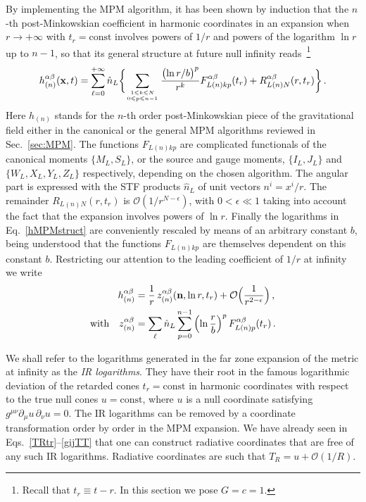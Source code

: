 \documentclass[prd,preprint,superscriptaddress,tightenlines,nofootinbib,
  eqsecnum,showpacs]{revtex4}
\begin{document}
By implementing the MPM algorithm, it has been shown by induction that
the $n$-th post-Minkowskian coefficient in harmonic coordinates in an
expansion when $r\to +\infty$ with $t_r=\text{const}$ involves powers
of $1/r$ and powers of the logarithm $\ln r$ up to $n-1$, so that its
general structure at future null infinity
reads~\cite{BD86}\footnote{Recall that $t_r\equiv t-r$.  In this
  section we pose $G=c=1$.}
%
\begin{equation}\label{hMPMstruct}
h^{\alpha\beta}_{(n)}(\mathbf{x}, t) = \sum_{\ell=0}^{+\infty}
\hat{n}_L \biggl\{\sum_{1 \leqslant k \leqslant N\atop 0\leqslant p
  \leqslant n-1} \frac{\bigl(\ln r/b\bigr)^p}{r^k}
F^{\alpha\beta}_{L(n)kp}(t_r) + R_{L(n)N}^{\alpha\beta}(r,t_r)
\biggr\} \,.
\end{equation}
%
Here $h_{(n)}$ stands for the $n$-th order post-Minkowskian
piece of the gravitational field either in the canonical or the
general MPM algorithms reviewed in Sec.~\ref{sec:MPM}. The functions
$F_{L(n)kp}$ are complicated functionals of the canonical moments
$\{M_L, S_L\}$, or the source and gauge moments, $\{I_L, J_L\}$ and
$\{W_L, X_L, Y_L, Z_L\}$ respectively, depending on the chosen
algorithm. The angular part is expressed with the STF products
$\hat{n}_L$ of unit vectors $n^i=x^i/r$. The remainder
$R_{L(n)N}(r,t_r)$ is $\mathcal{O}(1/r^{N-\epsilon})$, with
$0<\epsilon\ll 1$ taking into account the fact that the expansion
involves powers of $\ln r$. Finally the logarithms in
Eq.~\eqref{hMPMstruct} are conveniently rescaled by means of an
arbitrary constant $b$, being understood that the functions
$F_{L(n)kp}$ are themselves dependent on this constant
$b$. Restricting our attention to the leading coefficient of $1/r$ at
infinity we write
%
\begin{subequations}\label{hnasymp}
\begin{align}
h^{\alpha\beta}_{(n)} &= \frac{1}{r}
\,z^{\alpha\beta}_{(n)}(\mathbf{n}, \ln r, t_r) + \mathcal{O}\Bigl(
\frac{1}{r^{2-\epsilon}}\Bigr) \,,\\\text{with}\quad
z^{\alpha\beta}_{(n)} &= \sum_{\ell} \hat{n}_L \sum_{p=0}^{n-1}
\left(\ln\frac{r}{b}\right)^p F_{L(n)p}^{\alpha\beta}(t_r)\,.
\end{align}
\end{subequations}
%

We shall refer to the logarithms generated in the far zone expansion
of the metric at infinity as the \textit{IR logarithms}. They have
their root in the famous logarithmic deviation of the retarded cones
$t_r=\text{const}$ in harmonic coordinates with respect to the true
null cones $u=\text{const}$, where $u$ is a null coordinate
  satisfying $g^{\mu\nu}\partial_\mu u \,\partial_\nu u=0$. The IR
logarithms can be removed by a coordinate transformation order by
order in the MPM expansion. We have already seen in
Eqs.~\eqref{TRtr}--\eqref{gijTT} that one can construct radiative
coordinates that are free of any such IR logarithms. Radiative
coordinates are such that $T_R=u+\mathcal{O}(1/R)$.
\end{document}
